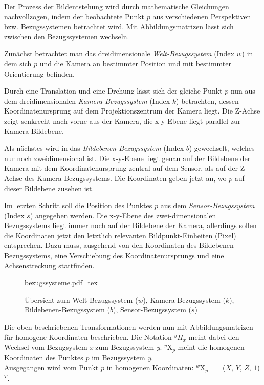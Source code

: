 Der Prozess der Bildentstehung wird durch mathematische Gleichungen nachvollzogen, indem der beobachtete Punkt $p$ aus verschiedenen Perspektiven bzw. Bezugssystemen betrachtet wird. Mit Abbildungsmatrizen lässt sich zwischen den Bezugssystemen wechseln.\kleinerabstand

{\noindent}Zunächst betrachtet man das dreidimensionale \emph{Welt-Bezugssystem} (Index $w$) in dem sich $p$ und die Kamera an bestimmter Position und mit bestimmter Orientierung befinden.

{\noindent}Durch eine Translation und eine Drehung lässt sich der gleiche Punkt $p$ nun aus dem dreidimensionalen \emph{Kamera-Bezugssystem} (Index $k$) betrachten, dessen Koordinatenursprung auf dem Projektionszentrum der Kamera liegt. Die Z-Achse zeigt senkrecht nach vorne aus der Kamera, die x-y-Ebene liegt parallel zur Kamera-Bildebene.

{\noindent}Als nächstes wird in das \emph{Bildebenen-Bezugssystem} (Index $b$) gewechselt, welches nur noch zweidimensional ist. Die x-y-Ebene liegt genau auf der Bildebene der Kamera mit dem Koordinatenursprung zentral auf dem Sensor, als auf der Z-Achse des Kamera-Bezugssystems. Die Koordinaten geben jetzt an, wo $p$ auf dieser Bildebene zusehen ist.

{\noindent}Im letzten Schritt soll die Position des Punktes $p$ aus dem \emph{Sensor-Bezugssystem} (Index $s$) angegeben werden. Die x-y-Ebene des zwei-dimensionalen Bezugssystems liegt immer noch auf der Bildebene der Kamera, allerdings sollen die Koordinaten jetzt den letztlich relevanten Bildpunkt-Einheiten (Pixel) entsprechen. Dazu muss, ausgehend von den Koordinaten des Bildebenen-Bezugssystems, eine Verschiebung des Koordinatenursprungs und eine Achsenstreckung stattfinden.

\begin{figure}[H]
	\centering
	\def\svgwidth{10cm}
	{bezugssysteme.pdf_tex}
	\caption[Übersicht zum Welt-Bezugssystem, Kamera-Bezugssystem, Bildebenen-Bezugssystem, Sensor-Bezugssystem]{Übersicht zum Welt-Bezugssystem ($w$), Kamera-Bezugssystem ($k$), Bildebenen-Bezugssystem ($b$), Sensor-Bezugssystem ($s$)}
	\label{fig:bezugssysteme}
\end{figure}

\grosserabstand
Die oben beschriebenen Transformationen werden nun mit Abbildungsmatrizen für homogene Koordinaten beschrieben. Die Notation $^yH_x$ meint dabei den Wechsel vom Bezugsystem \emph{x} zum Bezugssystem \emph{y}. $^y\mathrm{X}_p$ meint die homogenen Koordinaten des Punktes $p$ im Bezugssystem \emph{y}.\\
Ausgegangen wird vom Punkt $p$ in homogenen Koordinaten: $^w\mathrm{X}_p$ $=$ ($X$, $Y$, $Z$, $1$)$^T$.\kleinerabstand

